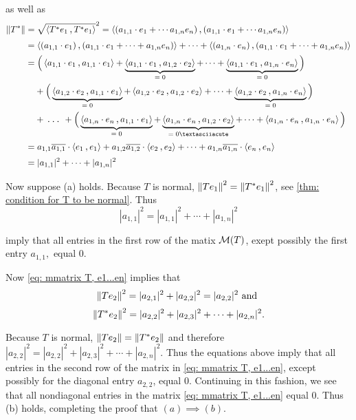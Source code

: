 \begin{prf}
  as well as
  \[
  \begin{aligned}
     \norm{T^*} &= \sqrt{\ip{T^*e_1}{T^*e_1}}^2
    = \ip{(a_{1,1}\cdot e_1 + \cdots a_{1,n} e_n)}{(a_{1,1}\cdot e_1 + \cdots a_{1,n} e_n)} \\
    & = \ip{(a_{1,1}\cdot e_1)}{(a_{1,1}\cdot e_1 + \cdots + a_{1,n} e_n)} + \cdots + \ip{(a_{1,n}\cdot e_n)}{(a_{1,1}\cdot e_1 + \cdots +a_{1,n} e_n)} \\
    & = \Big( \ip{a_{1,1} \cdot e_1}{a_{1,1}\cdot e_1} + \underbrace{\ip{a_{1,1} \cdot e_1}{a_{1,2}\cdot e_2}}_{= \; 0} + \cdots + \underbrace{\ip{a_{1,1} \cdot e_1}{a_{1,n}\cdot e_n}}_{= \; 0} \Big) \\
    & \phantom { = } \; +
    \Big( \underbrace{\ip{a_{1,2} \cdot e_2}{a_{1,1}\cdot e_1}}_{= \; 0} + \ip{a_{1,2} \cdot e_2}{a_{1,2}\cdot e_2} + \cdots + \underbrace{\ip{a_{1,2} \cdot e_2}{a_{1,n}\cdot e_n}}_{= \; 0} \Big) \\
    & \phantom { = } \; + \mathlarger{\ddd} +
    \Big( \underbrace{\ip{a_{1,n} \cdot e_n}{a_{1,1}\cdot e_1}}_{= \; 0} + \underbrace{\ip{a_{1,n} \cdot e_n}{a_{1,2}\cdot e_2}}_{= \; 0´} + \cdots + \ip{a_{1,n} \cdot e_n}{a_{1,n}\cdot e_n} \Big) \\
    & = a_{1,1} \overline{a_{1,1}} \cdot  \ip{e_1}{e_1} + a_{1,2} \overline{a_{1,2}} \cdot  \ip{e_2}{e_2} + \cdots + a_{1,n} \overline{a_{1,n}} \cdot  \ip{e_n}{e_n} \\
    & = |a_{1,1}|^2 + \cdots + |a_{1,n}|^2
  \end{aligned}
  \]

   Now suppose (a) holds. Because $T$ is normal, $\left \lVert T e_1 \right \rVert^2 = \left \lVert T^* e_1 \right \rVert^2$, see \ref{thm: condition for T to be normal}. Thus
  \[
  |a_{1,1}|^2 = |a_{1,1}|^2 + \cdots + |a_{1,n}|^2
  \]

  imply that all entries in the first row of the matix $\mathcal{M}(T)$, exept possibly the first entry $a_{1,1},$ equal $0$.

  Now \eqref{eq: mmatrix T, e1...en} implies that
  \[
  \norm{Te_2}^2 = |a_{2,1}|^2 + |a_{2,2}|^2 = |a_{2,2}|^2 $ and $
  \]
  \[
  \left \lVert T^* e_2 \right \rVert^2 = |a_{2,2}|^2 + |a_{2,3}|^2 + \cdots + |a_{2,n}|^2.
  \]

  Because $T$ is normal, $\left \lVert T e_2 \right \rVert = \left \lVert T^* e_2 \right \rVert$ and therefore $|a_{2,2}|^2=|a_{2,2}|^2 + |a_{2,3}|^2 + \cdots + |a_{2,n}|^2$. Thus the equations above imply that all entries in the second row of the matrix in \eqref{eq: mmatrix T, e1...en}, except possibly for the diagonal entry $a_{2,2}$, equal $0$. Continuing in this fashion, we see that all nondiagonal entries in the matrix \eqref{eq: mmatrix T, e1...en} equal $0$. Thus (b) holds, completing the proof that $(a) \implies (b)$.


\end{prf}
